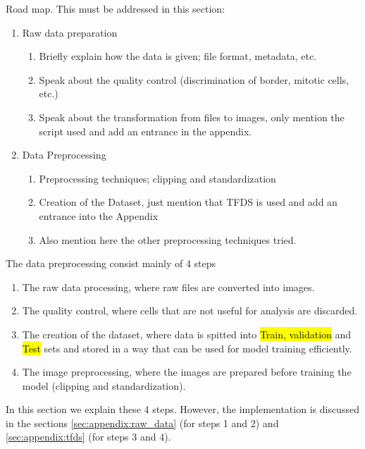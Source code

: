 
\glsresetall
\graphicspath{{./Sections/Dataset/Resources/}}


Road map. This must be addressed in this section:
\begin{enumerate}
  \item Raw data preparation
  \begin{enumerate}
    \item Briefly explain how the data is given; file format, metadata, etc.
    \item Speak about the quality control (discrimination of border, mitotic cells, etc.)
    \item Speak about the transformation from files to images, only mention the script used and add an entrance in the appendix.
  \end{enumerate}
  \item Data Preprocessing
  \begin{enumerate}
    \item Preprocessing techniques; clipping and standardization
    \item Creation of the Dataset, just mention that TFDS is used and add an entrance into the Appendix
    \item Also mention here the other preprocessing techniques tried.
  \end{enumerate}
\end{enumerate}

\noindent The data preprocessing consist mainly of 4 steps

\begin{enumerate}
  \item The raw data processing, where raw files are converted into images.
  \item The quality control, where cells that are not useful for analysis are discarded.
  \item The creation of the dataset, where data is spitted into \hl{Train, validation} and \hl{Test} sets and stored in a way that can be used for model training efficiently.
  \item The image preprocessing, where the images are prepared before training the model (clipping and standardization).
\end{enumerate}

In this section we explain these 4 steps. However, the implementation is discussed in the sections \ref{sec:appendix:raw_data} (for steps 1 and 2) and \ref{sec:appendix:tfds} (for steps 3 and 4).

